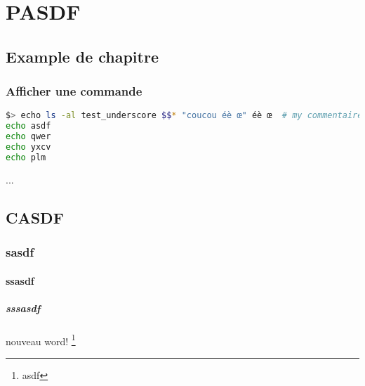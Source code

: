 \documentclass[../report]{subfiles}
\begin{document}
    \part{PASDF}

    \chapter{Example de chapitre}

    \section{Afficher une commande}


    \begin{lstlisting}[language=bash, caption={Descritpion du code},style=numbers]
$> echo ls -al test_underscore $$* "coucou éè œ" éè œ  # my commentaire very very very very very long
echo asdf
echo qwer
echo yxcv
echo plm
    \end{lstlisting}%
    ...
    
    \chapter{CASDF}

    \section{sasdf}

    \subsection{ssasdf}

    \subsubsection{sssasdf}

    nouveau word! \footnote{asdf}
\end{document}
